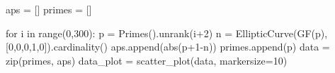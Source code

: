 \documentclass{article}
\begin{document}
\begin{sageblock}
  aps = []
  primes = []

  for i in range(0,300):
      p = Primes().unrank(i+2)
      n = EllipticCurve(GF(p),[0,0,0,1,0]).cardinality()
      aps.append(abs(p+1-n))
      primes.append(p)
  data = zip(primes, aps)
  data_plot = scatter_plot(data, markersize=10)
\end{sageblock}

\begin{center}
\end{center}
\end{document}
